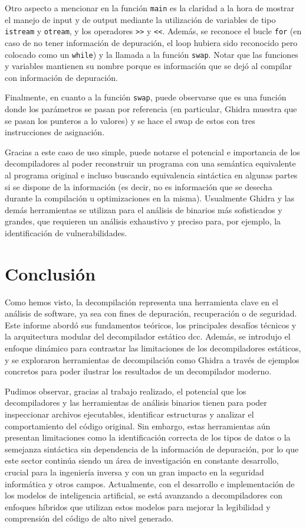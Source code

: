 \documentclass[runningheads]{llncs}
\begin{document}
Otro aspecto a mencionar en la función \verb|main| es la claridad a la hora de mostrar el manejo 
de input y de output mediante la utilización de variables de tipo \verb|istream| y \verb|otream|, y
los operadores \verb|>>| y \verb|<<|. Además, se reconoce el bucle \verb|for| (en caso de no tener 
información de depuración, el loop hubiera sido reconocido pero colocado como un \verb|while|) y la 
llamada a la función \verb|swap|. Notar que las funciones y variables mantienen su nombre porque es 
información que se dejó al compilar con información de depuración.

Finalmente, en cuanto a la función \verb|swap|, puede observarse que es una función donde los parámetros 
se pasan por referencia (en particular, Ghidra muestra que se pasan los punteros a lo valores)
y se hace el swap de estos con tres instrucciones de asignación.

Gracias a este caso de uso simple, puede notarse el potencial e importancia de los decompiladores 
al poder reconstruir un programa con una semántica equivalente al programa original e incluso buscando 
equivalencia sintáctica en algunas partes si se dispone de la información (es decir, no es información 
que se desecha durante la compilación u optimizaciones en la misma). Usualmente Ghidra
y las demás herramientas se utilizan para el análisis de binarios más sofisticados y grandes, que 
requieren un análisis exhaustivo y preciso para, por ejemplo, la identificación de vulnerabilidades.

\section{Conclusión}
Como hemos visto, la decompilación representa una herramienta clave en el análisis de software,
ya sea con fines de depuración, recuperación o de seguridad. Este informe abordó sus fundamentos teóricos,
los principales desafíos técnicos y la arquitectura modular del decompilador estático dcc. 
Además, se introdujo el enfoque dinámico para contrastar las limitaciones de los decompiladores 
estáticos, y se exploraron herramientas de decompilación como Ghidra a través de ejemplos concretos 
para poder ilustrar los resultados de un decompilador moderno. 

Pudimos observar, gracias al trabajo realizado, el potencial que los decompiladores y las herramientas 
de análisis binarios tienen para poder inspeccionar archivos ejecutables, identificar estructuras 
y analizar el comportamiento del código original. Sin embargo, estas herramientas aún presentan 
limitaciones como la identificación correcta de los tipos de datos o la semejanza sintáctica sin 
dependencia de la información de depuración, por lo que este sector continúa siendo un área de 
investigación en constante desarrollo, crucial para la ingeniería inversa y con un gran impacto 
en la seguridad informática y otros campos. Actualmente, con el desarrollo e implementación de 
los modelos de inteligencia artificial, se está avanzando a decompiladores con enfoques híbridos 
que utilizan estos modelos para mejorar la legibilidad y comprensión del código de alto nivel generado.
\end{document}
